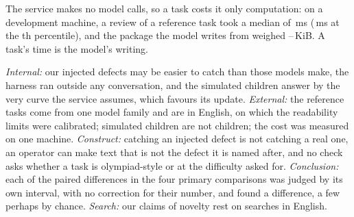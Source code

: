 The service makes no model calls, so a task costs it only computation: on a development machine, a review of a reference task took a median of \,ms (\,ms at the th percentile), and the package the model writes from weighed --\,KiB. A task's time is the model's writing.

\emph{Internal:} our injected defects may be easier to catch than those models make, the harness ran outside any conversation, and the simulated children answer by the very curve the service assumes, which favours its update. \emph{External:} the reference tasks come from one model family and are in English, on which the readability limits were calibrated; simulated children are not children; the cost was measured on one machine. \emph{Construct:} catching an injected defect is not catching a real one, an operator can make text that is not the defect it is named after, and no check asks whether a task is olympiad-style or at the difficulty asked for. \emph{Conclusion:} each of the  paired differences in the four primary comparisons was judged by its own interval, with no correction for their number, and  found a difference, a few perhaps by chance. \emph{Search:} our claims of novelty rest on searches in English.

